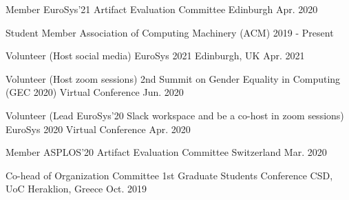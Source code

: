 
\begin{cvhonors}

  \cvhonor
    {Member} %
    {EuroSys'21 Artifact Evaluation Committee} %
    {Edinburgh} %
    {Apr. 2020} %

  \cvhonor
    {Student Member} %
    {Association of Computing Machinery (ACM)} %
    {} %
    {2019 - Present} %

  \cvhonor
    {Volunteer (Host social media)} %
    {EuroSys 2021} %
    {Edinburgh, UK} %
    {Apr. 2021} %

  \cvhonor
    {Volunteer (Host zoom sessions)} %
    {2nd Summit on Gender Equality in Computing (GEC 2020)} %
    {Virtual Conference} %
    {Jun. 2020} %


  \cvhonor
    {Volunteer (Lead EuroSys'20 Slack workspace and be a co-host in
    zoom sessions)} %
    {EuroSys 2020} %
    {Virtual Conference} %
    {Apr. 2020} %


  \cvhonor
    {Member} %
    {ASPLOS'20 Artifact Evaluation Committee} %
    {Switzerland} %
    {Mar. 2020} %

  \cvhonor
    {Co-head of Organization Committee} %
    {1st Graduate Students Conference CSD, UoC} %
    {Heraklion, Greece} %
    {Oct. 2019} %


\end{cvhonors}
